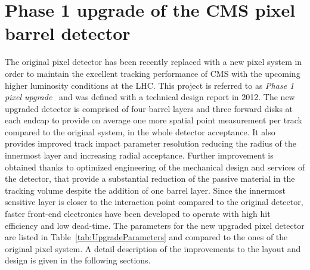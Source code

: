 \chapter{Phase 1 upgrade of the CMS pixel barrel detector}
\label{ch:Phase1Intro}

The original pixel detector has been recently replaced with a new pixel system in order to maintain the excellent tracking performance of CMS with the upcoming higher luminosity conditions at the LHC.
This project is referred to as \textit{Phase 1 pixel upgrade}~\cite{Dominguez:1481838} and was defined with a technical design report in 2012. The new upgraded detector is comprised of four barrel layers and three forward disks at each endcap to provide on average one more spatial point measurement per track compared to the original system, in the whole detector acceptance. It also provides improved track impact parameter resolution reducing the radius of the innermost layer and increasing radial acceptance. 
Further improvement is obtained thanks to optimized engineering of the mechanical design and services of the detector, that provide a substantial reduction of the passive material in the tracking volume despite the addition of one barrel layer. Since the innermost sensitive layer is closer to the interaction point compared to the original detector, faster front-end electronics have been developed to operate with high hit efficiency and low dead-time.
The parameters for the new upgraded pixel detector are listed in Table~\ref{tab:UpgradeParameters} and compared to the ones of the original pixel system.
A detail description of the improvements to the layout and design is given in the following sections.\\

